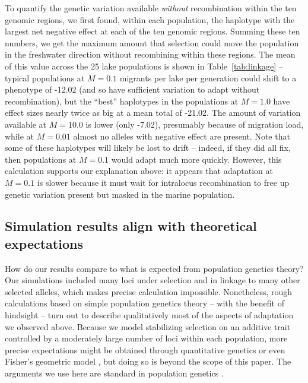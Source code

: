 \documentclass{article}
\begin{document}
To quantify the genetic variation available \emph{without} recombination within the ten genomic regions, we first found, within each population, the haplotype with the largest net negative effect at each of the ten genomic regions. Summing these ten numbers, we get the maximum amount that selection could move the population in the freshwater direction without recombining {within} these regions. The mean of this value across the 25 lake populations is shown in Table~\ref{tab:linkage} -- typical populations at $M=0.1$ migrants per lake per generation could shift to a phenotype of -12.02
(and so have sufficient variation to adapt without recombination), but the ``best'' haplotypes in the populations at $M=1.0$ have effect sizes nearly twice as big at a mean total of -21.02.
The amount of variation available at $M=10.0$ is lower (only -7.02), presumably because of migration load, while at $M=0.01$ almost no alleles with negative effect are present.
Note that some of these haplotypes will likely be lost to drift -- indeed, if they did all fix, then populations at $M=0.1$ would adapt much more quickly. 
However, this calculation supports our explanation above:
it appears that adaptation at $M=0.1$ is slower because it must wait for intralocus recombination to free up genetic variation present but masked in the marine population.

\subsection*{Simulation results align with theoretical expectations}

How do our results compare to what is expected from population genetics theory?
Our simulations included many loci under selection and in linkage to many other selected alleles,
which makes precise calculation impossible.
Nonetheless, rough calculations based on simple population genetics theory 
-- with the benefit of hindsight --
turn out to describe qualitatively most of the aspects of adaptation we observed above.
Because we model stabilizing selection on an additive trait controlled by a moderately large number of loci within each population, more precise expectations might be obtained through quantitative genetics \citep{svardal2014general} or even Fisher's geometric model \citep{barton2001hybridization,chevin2014niche},
but doing so is beyond the scope of this paper.
The arguments we use here are standard in population genetics
\citep[see e.g.,][]{Gillespie_1998}. 
\end{document}
